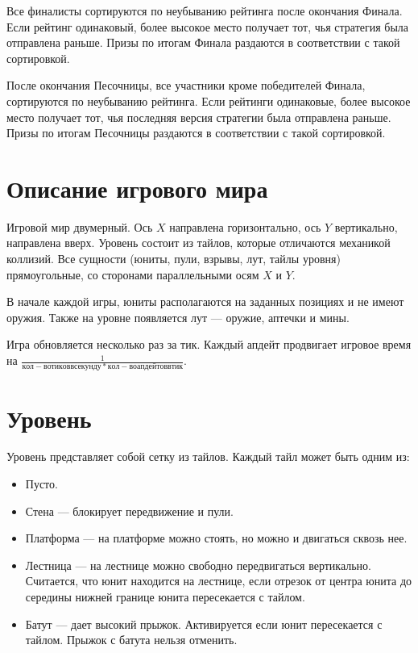 Все финалисты сортируются по неубыванию рейтинга после окончания Финала. Если рейтинг одинаковый, более высокое место получает тот, чья стратегия была отправлена раньше.
Призы по итогам Финала раздаются в соответствии с такой сортировкой.

После окончания Песочницы, все участники кроме победителей Финала, сортируются по неубыванию рейтинга. Если рейтинги одинаковые,
более высокое место получает тот, чья последняя версия стратегии была отправлена раньше. Призы по итогам Песочницы раздаются в соответствии с такой сортировкой.

\section{Описание игрового мира}

Игровой мир двумерный.
Ось $X$ направлена горизонтально, ось $Y$ вертикально, направлена вверх.
Уровень состоит из тайлов, которые отличаются механикой коллизий.
Все сущности (юниты, пули, взрывы, лут, тайлы уровня) прямоугольные, со сторонами параллельными осям $X$ и $Y$.

В начале каждой игры, юниты располагаются на заданных позициях и не имеют оружия.
Также на уровне появляется лут --- оружие, аптечки и мины.

Игра обновляется несколько раз за тик.
Каждый апдейт продвигает игровое время на $\frac{1}{кол-во тиков в секунду * кол-во апдейтов в тик}$.

\section{Уровень}

Уровень представляет собой сетку из тайлов. Каждый тайл может быть одним из:
\begin{itemize}
      \item Пусто.
      \item Стена --- блокирует передвижение и пули.
      \item Платформа --- на платформе можно стоять, но можно и двигаться сквозь нее.
      \item Лестница --- на лестнице можно свободно передвигаться вертикально.
            Считается, что юнит находится на лестнице, если отрезок от центра юнита до середины нижней границе юнита пересекается с тайлом.
      \item Батут --- дает высокий прыжок. Активируется если юнит пересекается с тайлом.
            Прыжок с батута нельзя отменить.
\end{itemize}

